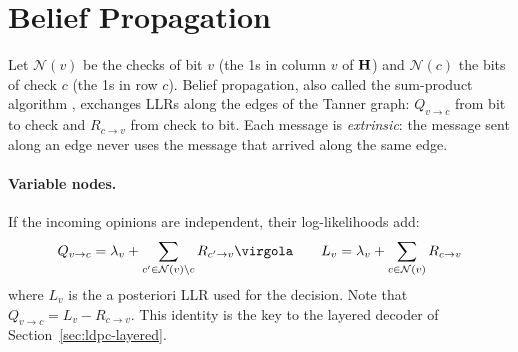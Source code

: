 \section{Belief Propagation} \label{sec:ldpc-bp}

Let \(\mathcal{N}(v)\) be the checks of bit \(v\) (the 1s in column \(v\) of \(\mathbf{H}\)) and \(\mathcal{N}(c)\) the bits of check \(c\) (the 1s in row \(c\)). Belief propagation, also called the sum-product algorithm \cite{b:FactorGraphs, b:LDPCGall, b:MacKay}, exchanges LLRs along the edges of the Tanner graph: \(Q_{v \to c}\) from bit to check and \(R_{c \to v}\) from check to bit. Each message is \emph{extrinsic}: the message sent along an edge never uses the message that arrived along the same edge.

\paragraph{Variable nodes.} If the incoming opinions are independent, their log-likelihoods add:
\begin{equation} \label{eq:ldpc-vn}
Q_{v \to c} = \lambda_v + \sum_{c' \in \mathcal{N}(v) \setminus c} R_{c' \to v} \virgola \qquad L_v = \lambda_v + \sum_{c \in \mathcal{N}(v)} R_{c \to v}
\end{equation}
where \(L_v\) is the a posteriori LLR used for the decision. Note that \(Q_{v \to c} = L_v - R_{c \to v}\). This identity is the key to the layered decoder of Section~\ref{sec:ldpc-layered}.

